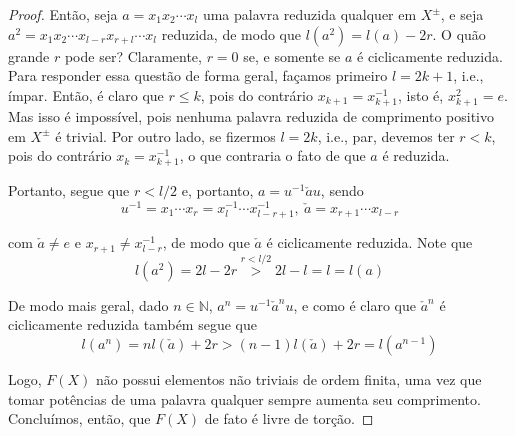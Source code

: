    	\begin{proof} 
        	Então, seja $a = x_1x_2\cdots x_l$ uma palavra reduzida qualquer em $X^{\pm}$, e seja 
        	$a^2 = x_1x_2\cdots x_{l-r}x_{r+l}\cdots x_l$ reduzida, de modo que $l(a^2) = l(a) - 2r$. O quão 
        	grande $r$ pode ser? Claramente, $r=0$ se, e somente se $a$ é ciclicamente reduzida. Para responder 
        	essa questão de forma geral, façamos primeiro $l = 2k + 1$, i.e., ímpar. Então, é claro que $r\leq k$,
        	pois do contrário $x_{k+1} = x_{k+1}^{-1}$, isto é, $x_{k+1}^2 = e$. Mas isso é impossível, pois 
        	nenhuma palavra reduzida de comprimento positivo em $X^{\pm}$ é trivial. Por outro lado, se 
        	fizermos $l = 2k$, i.e., par, devemos ter $r<k$, pois do contrário $x_k = x_{k+1}^{-1}$, o que 
        	contraria o fato de que $a$ é reduzida.
    	
    	    \par\vspace{0.3cm} Portanto, segue que $r< l/2$ e, portanto, $a = u^{-1}\check{a}u$, sendo
    		\begin{equation*}
    		    u^{-1} = x_1\cdots x_r = x_l^{-1}\cdots x_{l-r+1}^{-1}, \ \check{a} = x_{r+1}\cdots x_{l-r}
    		\end{equation*}
    		\par\vspace{0.3cm} com $\check{a}\neq e$ e $x_{r+1}\neq x_{l-r}^{-1}$, de modo que 
    		$\check{a}$ é ciclicamente reduzida. Note que 
    		\begin{equation*}
    		    l(a^2) = 2l - 2r \stackrel{r<l/2}{>} 2l - l = l = l(a)
    		\end{equation*}
    		\par\vspace{0.3cm} De modo mais geral, dado $n\in\mathbb{N}$, $a^n = u^{-1}\check{a}^nu$, 
    		e como é claro que $\check{a}^n$ é ciclicamente reduzida também segue que 
    		\begin{equation}
    		\label{comprimento de a^n}
    		    l(a^n) = nl(\check{a}) + 2r > (n-1)l(\check{a}) + 2r = l(a^{n-1})
    		\end{equation}
    		\par\vspace{0.3cm} Logo, $F(X)$ não possui elementos não triviais de ordem finita, uma vez 
    		que tomar potências de uma palavra qualquer sempre aumenta seu comprimento. Concluímos, então, 
    		que $F(X)$ de fato é livre de torção.
    	\end{proof}
